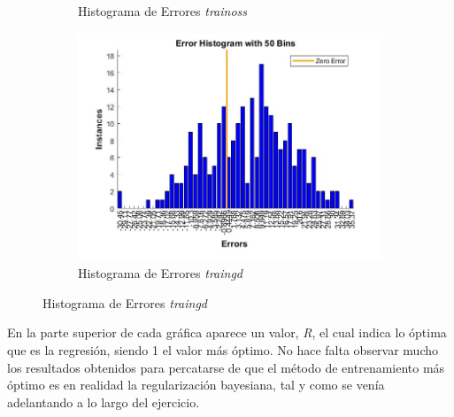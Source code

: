 \documentclass{article}
\begin{document}
\begin{figure}[H]
\begin{subfigure}{0.4\textwidth}
  \caption{Histograma de Errores \textit{trainoss}}
 \end{subfigure}
 \begin{subfigure}{0.4\textwidth}
  \includegraphics[width=0.8\linewidth]{../images/I_ex3_errorhistogram_bodyfat_dataset_traingd.jpg}
  \caption{Histograma de Errores \textit{traingd}}
 \end{subfigure}
\end{figure}
 
En la parte superior de cada gráfica aparece un valor, \textit{R}, el cual
indica lo óptima que es la regresión, siendo 1 el valor más óptimo. No hace
falta observar mucho los resultados obtenidos para percatarse de que el método
de entrenamiento más óptimo es en realidad la regularización bayesiana, tal y
como se venía adelantando a lo largo del ejercicio. 
\end{document}
